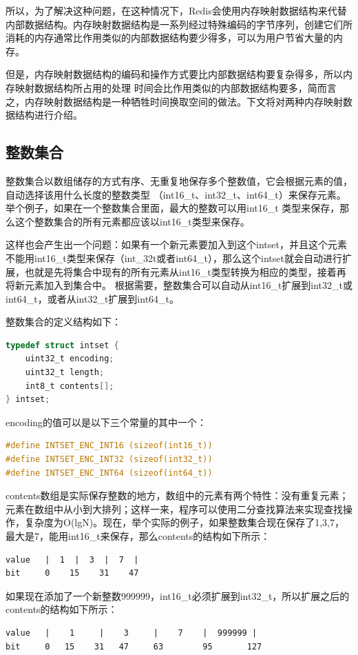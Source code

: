 \documentclass{zjutthesis}
\begin{document}
所以，为了解决这种问题，在这种情况下，Redis会使用内存映射数据结构来代替内部数据结构。内存映射数据结构是一系列经过特殊编码的字节序列，创建它们所消耗的内存通常比作用类似的内部数据结构要少得多，可以为用户节省大量的内存。

但是，内存映射数据结构的编码和操作方式要比内部数据结构要复杂得多，所以内存映射数据结构所占用的处理 时间会比作用类似的内部数据结构要多，简而言之，内存映射数据结构是一种牺牲时间换取空间的做法。下文将对两种内存映射数据结构进行介绍。

\subsection{整数集合}
整数集合以数组储存的方式有序、无重复地保存多个整数值，它会根据元素的值，自动选择该用什么长度的整数类型
（int16\_t、int32\_t、int64\_t）来保存元素。
举个例子，如果在一个整数集合里面，最大的整数可以用int16\_t
类型来保存，那么这个整数集合的所有元素都应该以int16\_t类型来保存。

这样也会产生出一个问题：如果有一个新元素要加入到这个intset，并且这个元素不能用int16\_t类型来保存（int\_32t或者int64\_t），那么这个intset就会自动进行扩展，也就是先将集合中现有的所有元素从int16\_t类型转换为相应的类型，接着再将新元素加入到集合中。
根据需要，整数集合可以自动从int16\_t扩展到int32\_t或int64\_t，或者从int32\_t扩展到int64\_t。

整数集合的定义结构如下：
\begin{lstlisting}[language=C]
typedef struct intset {
    uint32_t encoding;
    uint32_t length;
    int8_t contents[];
} intset;
\end{lstlisting}
encoding的值可以是以下三个常量的其中一个：
\begin{lstlisting}[language=C]
#define INTSET_ENC_INT16 (sizeof(int16_t))
#define INTSET_ENC_INT32 (sizeof(int32_t))
#define INTSET_ENC_INT64 (sizeof(int64_t))
\end{lstlisting}
contents数组是实际保存整数的地方，数组中的元素有两个特性：没有重复元素；元素在数组中从小到大排列；这样一来，程序可以使用二分查找算法来实现查找操作，复杂度为O(lgN)。现在，举个实际的例子，如果整数集合现在保存了{1,3,7}，最大是7，能用int16\_t来保存，那么contents的结构如下所示：

\begin{verbatim}
value   |  1  |  3  |  7  |
bit     0    15    31    47
\end{verbatim}
如果现在添加了一个新整数999999，int16\_t必须扩展到int32\_t，所以扩展之后的contents的结构如下所示：
\begin{verbatim}
value   |    1     |    3     |    7    |  999999 |
bit     0   15    31   47     63        95       127
\end{verbatim}
\end{document}
